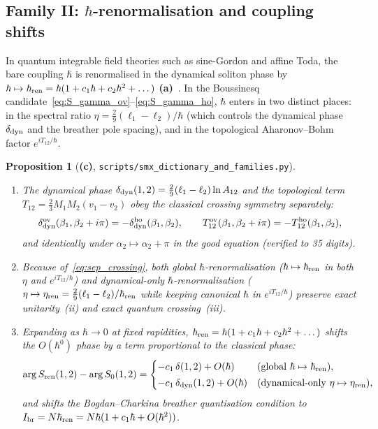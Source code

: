 \documentclass[11pt,a4paper]{article}
\newcommand{\La}{\textsf{\textbf{(a)}}}
\newcommand{\Lc}{\textsf{\textbf{(c)}}}
\newcommand{\script}[1]{\texttt{scripts/\allowbreak #1}}
\newtheorem{proposition}{Proposition}[section]
\theoremstyle{remark}
\begin{document}
\subsection{Family II: \texorpdfstring{$\hbar$}{hbar}-renormalisation and coupling shifts}
In quantum integrable field theories such as sine-Gordon and affine Toda, the bare coupling $\hbar$ is renormalised in the dynamical soliton phase by $\hbar\mapsto\hbar_{\rm ren}=\hbar(1+c_1\hbar+c_2\hbar^2+\dots)$ \La~\cite{FK,Hol92}. In the Boussinesq candidate~\eqref{eq:S_gamma_ov}--\eqref{eq:S_gamma_ho}, $\hbar$ enters in two distinct places: in the spectral ratio $\eta=\frac29(\ell_1-\ell_2)/\hbar$ (which controls the dynamical phase $\delta_{\rm dyn}$ and the breather pole spacing), and in the topological Aharonov--Bohm factor $e^{iT_{12}/\hbar}$.

\begin{proposition}[\Lc, \script{smx\_dictionary\_and\_families.py}]\label{prop:fam2}
\begin{enumerate}
\item The dynamical phase $\delta_{\rm dyn}(1,2)=\frac29(\ell_1-\ell_2)\ln A_{12}$ and the topological term $T_{12}=\frac23 M_1 M_2(v_1-v_2)$ obey the classical crossing symmetry \emph{separately}:
\begin{equation}\label{eq:sep_crossing}
\delta_{\rm dyn}^{\rm ov}(\beta_1,\beta_2+i\pi)=-\delta_{\rm dyn}^{\rm ho}(\beta_1,\beta_2),\qquad
T_{12}^{\rm ov}(\beta_1,\beta_2+i\pi)=-T_{12}^{\rm ho}(\beta_1,\beta_2),
\end{equation}
and identically under $\alpha_2\mapsto\alpha_2+\pi$ in the good equation (verified to 35 digits).
\item Because of~\eqref{eq:sep_crossing}, both \emph{global} $\hbar$-renormalisation ($\hbar\mapsto\hbar_{\rm ren}$ in both $\eta$ and $e^{iT_{12}/\hbar}$) and \emph{dynamical-only} $\hbar$-renormalisation ($\eta\mapsto\eta_{\rm ren}=\frac29(\ell_1-\ell_2)/\hbar_{\rm ren}$ while keeping canonical $\hbar$ in $e^{iT_{12}/\hbar}$) preserve exact unitarity~(ii) and exact quantum crossing~(iii).
\item Expanding as $\hbar\to 0$ at fixed rapidities, $\hbar_{\rm ren}=\hbar(1+c_1\hbar+c_2\hbar^2+\dots)$ shifts the $O(\hbar^0)$ phase by a term proportional to the classical phase:
\begin{equation}\label{eq:hbar_ren_shift}
\arg S_{\rm ren}(1,2)-\arg S_0(1,2)=
\begin{cases}
-c_1\,\delta(1,2)+O(\hbar) & (\text{global }\hbar\mapsto\hbar_{\rm ren}),\\[2pt]
-c_1\,\delta_{\rm dyn}(1,2)+O(\hbar) & (\text{dynamical-only }\eta\mapsto\eta_{\rm ren}),
\end{cases}
\end{equation}
and shifts the Bogdan--Charkina breather quantisation condition to $I_{\rm br}=N\hbar_{\rm ren}=N\hbar(1+c_1\hbar+O(\hbar^2))$.
\end{enumerate}
\end{proposition}
\end{document}
